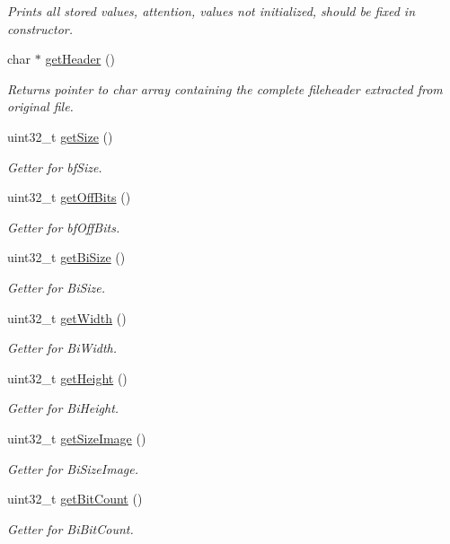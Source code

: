 \begin{DoxyCompactItemize}
\begin{DoxyCompactList}\small\item\em Prints all stored values, attention, values not initialized, should be fixed in constructor. \end{DoxyCompactList}\item 
char $\ast$ \mbox{\hyperlink{classBitmapHeader_aa29e1acc8a7a588867039d7c0bdcde04}{get\+Header}} ()
\begin{DoxyCompactList}\small\item\em Returns pointer to char array containing the complete fileheader extracted from original file. \end{DoxyCompactList}\item 
uint32\+\_\+t \mbox{\hyperlink{classBitmapHeader_a53309aa035484da90e8170f9950aa86b}{get\+Size}} ()
\begin{DoxyCompactList}\small\item\em Getter for bf\+Size. \end{DoxyCompactList}\item 
uint32\+\_\+t \mbox{\hyperlink{classBitmapHeader_a70702e4d8aba2a3502f776f73bfecde8}{get\+Off\+Bits}} ()
\begin{DoxyCompactList}\small\item\em Getter for bf\+Off\+Bits. \end{DoxyCompactList}\item 
uint32\+\_\+t \mbox{\hyperlink{classBitmapHeader_acce4b6292e2aaf5dbd4bc10687c4fb65}{get\+Bi\+Size}} ()
\begin{DoxyCompactList}\small\item\em Getter for Bi\+Size. \end{DoxyCompactList}\item 
uint32\+\_\+t \mbox{\hyperlink{classBitmapHeader_af1d36ee9f3315866f05c39c2f4871e09}{get\+Width}} ()
\begin{DoxyCompactList}\small\item\em Getter for Bi\+Width. \end{DoxyCompactList}\item 
uint32\+\_\+t \mbox{\hyperlink{classBitmapHeader_a106f72d6c256327342029edf8e18bde1}{get\+Height}} ()
\begin{DoxyCompactList}\small\item\em Getter for Bi\+Height. \end{DoxyCompactList}\item 
uint32\+\_\+t \mbox{\hyperlink{classBitmapHeader_aa55f157d6852ce35add8c5db54ccadae}{get\+Size\+Image}} ()
\begin{DoxyCompactList}\small\item\em Getter for Bi\+Size\+Image. \end{DoxyCompactList}\item 
uint32\+\_\+t \mbox{\hyperlink{classBitmapHeader_a2660782990f1d9547e0aef501f666969}{get\+Bit\+Count}} ()
\begin{DoxyCompactList}\small\item\em Getter for Bi\+Bit\+Count. \end{DoxyCompactList}\end{DoxyCompactItemize}
